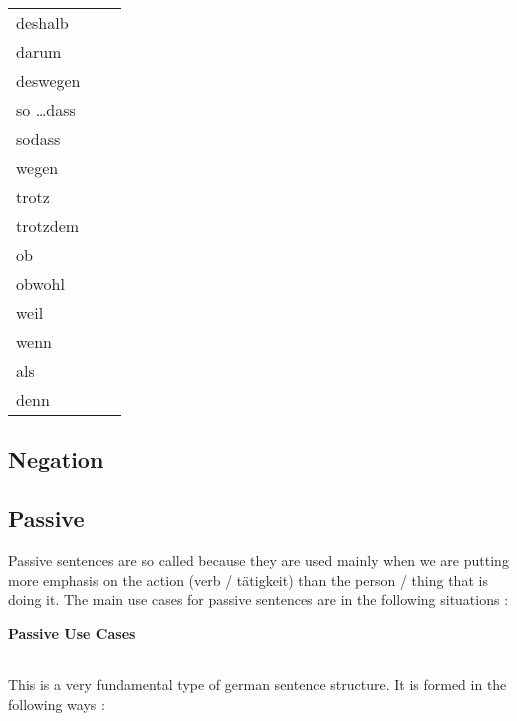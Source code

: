 \documentclass[a4paper,twocolumn,10pt]{article}
\newcommand{\newpar}
{\par \vspace{0.3cm}}
\newcommand{\subsectionend}
{
\nolinenumbers
\linenumbers
}
\newcommand{\tabularxtable}[3]
{

	\vspace{0.5cm}
	\nolinenumbers

	\begin{tabularx}{#1}{#2}
		#3
	\end{tabularx}

	\linenumbers
	\vspace{0.5cm}
}
\begin{document}
\tabularxtable
{0.95\linewidth}
{llX}
{
deshalb & & \\
darum & & \\
deswegen& & \\
so \ldots dass& & \\
sodass& & \\
wegen& & \\
trotz& & \\
trotzdem& & \\
ob& & \\
obwohl& & \\
weil& & \\
wenn& & \\
als& & \\
denn& & \\
}


\subsectionend

\subsection{Negation}
\label{ssec:negation}


\subsectionend

\subsection{Passive}
\label{ssec:passive}

Passive sentences are so called because they are used mainly when we are putting
more emphasis on the action (verb / tätigkeit) than the person / thing that is
doing it. The main use cases for passive sentences are in the following
situations :\newpar

\textbf{Passive Use Cases}
\tabularxtable
{0.95\linewidth}
{lX}
{

}


This is a very fundamental type of german sentence structure. It is
formed in the following ways :\newpar






\end{document}
